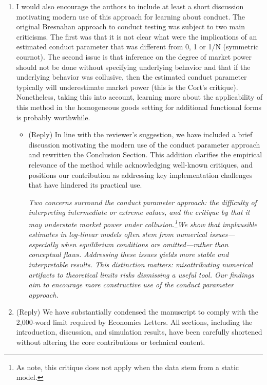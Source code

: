 \documentclass[11pt, a4paper]{article}
\theoremstyle{remark}
\begin{document}
\begin{enumerate}
\begin{itemize}
    \end{itemize}
    \item I would also encourage the authors to include at least a short discussion motivating modern use of this approach for learning about conduct. The original Bresnahan approach to conduct testing was subject to two main criticisms. The first was that it is not clear what were the implications of an estimated conduct parameter that was different from 0, 1 or 1/N (symmetric cournot). The second issue is that inference on the degree of market power should not be done without specifying underlying behavior and that if the underlying behavior was collusive, then the estimated conduct parameter typically will underestimate market power (this is the Cort’s critique). Nonetheless, taking this into account, learning more about the applicability of this method in the homogeneous goods setting for additional functional forms is probably worthwhile.
    \begin{itemize}
        \item (Reply) In line with the reviewer’s suggestion, we have included a brief discussion motivating the modern use of the conduct parameter approach and rewritten the Conclusion Section. This addition clarifies the empirical relevance of the method while acknowledging well-known critiques, and positions our contribution as addressing key implementation challenges that have hindered its practical use.
        
        \textit{Two concerns surround the conduct parameter approach: the difficulty of interpreting intermediate or extreme values, and the critique by \citet{corts1999conduct} that it may understate market power under collusion.\footnote{As \citet{magnolfi2022comparison} note, this critique does not apply when the data stem from a static model.}We show that implausible estimates in log-linear models often stem from numerical issues—especially when equilibrium conditions are omitted—rather than conceptual flaws. Addressing these issues yields more stable and interpretable results.
        This distinction matters: misattributing numerical artifacts to theoretical limits risks dismissing a useful tool. Our findings aim to encourage more constructive use of the conduct parameter approach.}
    \end{itemize}
    \item (Reply) We have substantially condensed the manuscript to comply with the 2,000-word limit required by Economics Letters. All sections, including the introduction, discussion, and simulation results, have been carefully shortened without altering the core contributions or technical content.
\end{enumerate}
\end{document}
